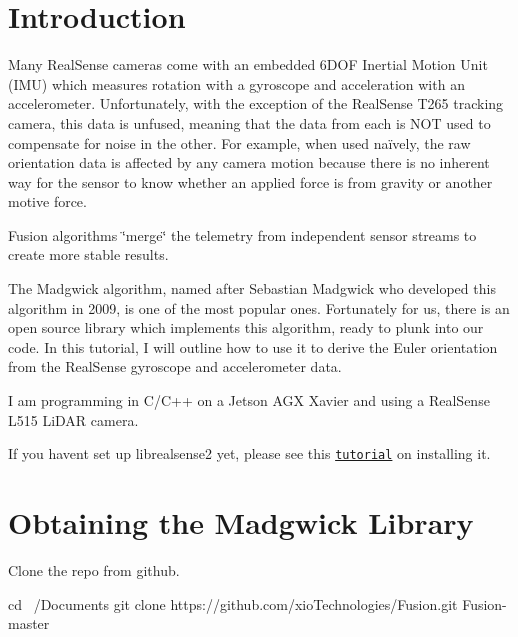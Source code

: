 \hypertarget{index_intro_sec}{}\section{Introduction}\label{index_intro_sec}
\begin{DoxyParagraph}{}
Many Real\+Sense cameras come with an embedded 6\+D\+OF Inertial Motion Unit (I\+MU) which measures rotation with a gyroscope and acceleration with an accelerometer. Unfortunately, with the exception of the Real\+Sense T265 tracking camera, this data is unfused, meaning that the data from each is N\+OT used to compensate for noise in the other. For example, when used naïvely, the raw orientation data is affected by any camera motion because there is no inherent way for the sensor to know whether an applied force is from gravity or another motive force. 
\end{DoxyParagraph}
\begin{DoxyParagraph}{}
Fusion algorithms \char`\"{}merge\char`\"{} the telemetry from independent sensor streams to create more stable results. 
\end{DoxyParagraph}
\begin{DoxyParagraph}{}
The Madgwick algorithm, named after Sebastian Madgwick who developed this algorithm in 2009, is one of the most popular ones. Fortunately for us, there is an open source library which implements this algorithm, ready to plunk into our code. In this tutorial, I will outline how to use it to derive the Euler orientation from the Real\+Sense gyroscope and accelerometer data. 
\end{DoxyParagraph}
\begin{DoxyParagraph}{}
I am programming in C/\+C++ on a Jetson A\+GX Xavier and using a Real\+Sense L515 Li\+D\+AR camera. 
\end{DoxyParagraph}
\begin{DoxyParagraph}{}
If you haven\textquotesingle{}t set up {\ttfamily librealsense2} yet, please see this \href{https://www.notion.so/How-to-install-librealsense-and-pylibrealsense-on-Jetson-5b909aeb1b6c409fb21464f2db869d41}{\tt tutorial} on installing it. 
\end{DoxyParagraph}
\hypertarget{index_download_sec}{}\section{Obtaining the Madgwick Library}\label{index_download_sec}
\begin{DoxyParagraph}{}
Clone the repo from github. 
\begin{DoxyCode}
cd ~/Documents
git clone https://github.com/xioTechnologies/Fusion.git Fusion-master
\end{DoxyCode}
 
\end{DoxyParagraph}
